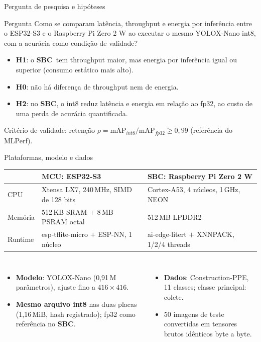 \documentclass[aspectratio=169,11pt]{beamer}
\newcommand{\sbc}{\textcolor{azul}{\textbf{SBC}}}
\newcommand{\destaque}[1]{\textcolor{azul}{\textbf{#1}}}
\begin{document}
\begin{frame}{Pergunta de pesquisa e hipóteses}
\begin{block}{Pergunta}
Como se comparam latência, throughput e energia por inferência entre o ESP32-S3 e o Raspberry Pi Zero 2 W ao
executar o mesmo YOLOX-Nano int8, com a acurácia como condição de validade?
\end{block}
\vspace{0.2cm}
\begin{itemize}
\item \destaque{H1}: o \sbc\ tem throughput maior, mas energia por inferência igual ou superior (consumo estático mais alto).
\item \destaque{H0}: não há diferença de throughput nem de energia.
\item \destaque{H2}: no \sbc, o int8 reduz latência e energia em relação ao fp32, ao custo de uma perda de acurácia quantificada.
\end{itemize}
\vspace{0.1cm}
{\small\color{cinza} Critério de validade: retenção $\rho=\mathrm{mAP}_{int8}/\mathrm{mAP}_{fp32}\geq0{,}99$ (referência do MLPerf).}
\end{frame}

\begin{frame}{Plataformas, modelo e dados}
\small
\begin{tabularx}{\linewidth}{lLL}\toprule
 & \textcolor{roxo}{\textbf{MCU: ESP32-S3}} & \textcolor{azul}{\textbf{SBC: Raspberry Pi Zero 2 W}}\\\midrule
CPU & Xtensa LX7, 240\,MHz, SIMD de 128 bits & Cortex-A53, 4 núcleos, 1\,GHz, NEON\\
Memória & 512\,KB SRAM $+$ 8\,MB PSRAM octal & 512\,MB LPDDR2\\
Runtime & esp-tflite-micro $+$ ESP-NN, 1 núcleo & ai-edge-litert $+$ XNNPACK, 1/2/4 threads\\\bottomrule
\end{tabularx}
\vspace{0.3cm}
\begin{columns}[T]
\begin{itemize}
\item \destaque{Modelo}: YOLOX-Nano (0,91\,M parâmetros), ajuste fino a $416\times416$.
\item \destaque{Mesmo arquivo int8} nas duas placas (1,16\,MiB, hash registrado); fp32 como referência no \sbc.
\end{itemize}
\begin{itemize}
\item \destaque{Dados}: Construction-PPE, 11 classes; classe principal: colete.
\item 50 imagens de teste convertidas em tensores brutos idênticos byte a byte.
\end{itemize}
\end{columns}
\end{frame}
\end{document}
